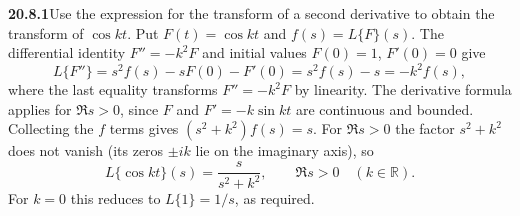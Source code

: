 \par\bigskip
\noindent\textbf{20.8.1}\quad Use the expression for the transform
of a second derivative to obtain the transform of $\cos kt$.
\solution
Put $F(t)=\cos kt$ and $f(s)=L\{F\}(s)$. The differential
identity $F''=-k^2F$ and initial values $F(0)=1$, $F'(0)=0$
give
\[
L\{F''\}=s^2f(s)-sF(0)-F'(0)=s^2f(s)-s=-k^2f(s),
\]
where the last equality transforms $F''=-k^2F$ by linearity.
The derivative formula applies for $\Re s>0$, since $F$ and
$F'=-k\sin kt$ are continuous and bounded. Collecting the $f$
terms gives $(s^2+k^2)f(s)=s$. For $\Re s>0$ the factor
$s^2+k^2$ does not vanish (its zeros $\pm ik$ lie on the
imaginary axis), so
\[
\boxed{L\{\cos kt\}(s)=\frac{s}{s^2+k^2}},\qquad \Re s>0
\quad(k\in\mathbb R).
\]
For $k=0$ this reduces to $L\{1\}=1/s$, as required.

